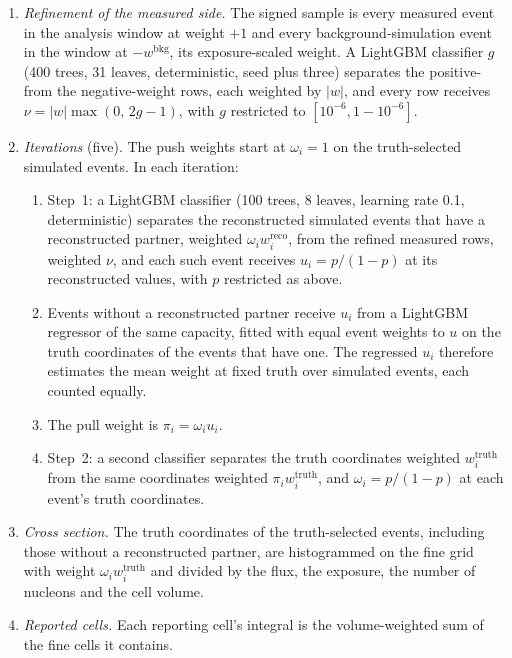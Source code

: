 \begin{enumerate}[itemsep=1pt, topsep=2pt]
  \item \emph{Refinement of the measured side.} The signed sample is every measured event in the analysis window at weight $+1$ and every background-simulation event in the window at $-w^{\mathrm{bkg}}$, its exposure-scaled weight. A LightGBM classifier $g$ (400 trees, 31 leaves, deterministic, seed plus three) separates the positive- from the negative-weight rows, each weighted by $|w|$, and every row receives $\nu=|w|\max(0,\,2g-1)$, with $g$ restricted to $[10^{-6},1-10^{-6}]$.
  \item \emph{Iterations} (five). The push weights start at $\omega_i=1$ on the truth-selected simulated events. In each iteration:
  \begin{enumerate}[itemsep=0pt, topsep=1pt]
    \item Step~1: a LightGBM classifier (100 trees, 8 leaves, learning rate 0.1, deterministic) separates the reconstructed simulated events that have a reconstructed partner, weighted $\omega_i w^{\mathrm{reco}}_i$, from the refined measured rows, weighted $\nu$, and each such event receives $u_i=p/(1-p)$ at its reconstructed values, with $p$ restricted as above.
    \item Events without a reconstructed partner receive $u_i$ from a LightGBM regressor of the same capacity, fitted with equal event weights to $u$ on the truth coordinates of the events that have one. The regressed $u_i$ therefore estimates the mean weight at fixed truth over simulated events, each counted equally.
    \item The pull weight is $\pi_i=\omega_i u_i$.
    \item Step~2: a second classifier separates the truth coordinates weighted $w^{\mathrm{truth}}_i$ from the same coordinates weighted $\pi_i w^{\mathrm{truth}}_i$, and $\omega_i=p/(1-p)$ at each event's truth coordinates.
  \end{enumerate}
  \item \emph{Cross section.} The truth coordinates of the truth-selected events, including those without a reconstructed partner, are histogrammed on the fine grid with weight $\omega_i w^{\mathrm{truth}}_i$ and divided by the flux, the exposure, the number of nucleons and the cell volume.
  \item \emph{Reported cells.} Each reporting cell's integral is the volume-weighted sum of the fine cells it contains.
\end{enumerate}

